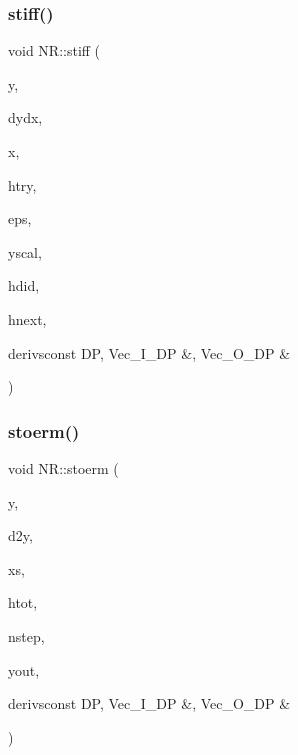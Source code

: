 \subsubsection{\texorpdfstring{stiff()}{stiff()}}
{\footnotesize\ttfamily void N\+R\+::stiff (\begin{DoxyParamCaption}\item[{\mbox{\hyperlink{namespaceNR_ab293e06a6bf799d8a7ed932b6852bcb8}{Vec\+\_\+\+I\+O\+\_\+\+DP}} \&}]{y,  }\item[{\mbox{\hyperlink{namespaceNR_ab293e06a6bf799d8a7ed932b6852bcb8}{Vec\+\_\+\+I\+O\+\_\+\+DP}} \&}]{dydx,  }\item[{\mbox{\hyperlink{namespaceNR_af6ff762dd605ff477b8e52387253a02a}{DP}} \&}]{x,  }\item[{const \mbox{\hyperlink{namespaceNR_af6ff762dd605ff477b8e52387253a02a}{DP}}}]{htry,  }\item[{const \mbox{\hyperlink{namespaceNR_af6ff762dd605ff477b8e52387253a02a}{DP}}}]{eps,  }\item[{\mbox{\hyperlink{namespaceNR_a9f943da53862537c552e2a770cb170ae}{Vec\+\_\+\+I\+\_\+\+DP}} \&}]{yscal,  }\item[{\mbox{\hyperlink{namespaceNR_af6ff762dd605ff477b8e52387253a02a}{DP}} \&}]{hdid,  }\item[{\mbox{\hyperlink{namespaceNR_af6ff762dd605ff477b8e52387253a02a}{DP}} \&}]{hnext,  }\item[{void }]{derivsconst D\+P, Vec\+\_\+\+I\+\_\+\+D\+P \&, Vec\+\_\+\+O\+\_\+\+D\+P \& }\end{DoxyParamCaption})}

\mbox{\label{namespaceNR_a9a4beb20936c6e96b577a4f5e8c9d157}} 
\subsubsection{\texorpdfstring{stoerm()}{stoerm()}}
{\footnotesize\ttfamily void N\+R\+::stoerm (\begin{DoxyParamCaption}\item[{\mbox{\hyperlink{namespaceNR_a9f943da53862537c552e2a770cb170ae}{Vec\+\_\+\+I\+\_\+\+DP}} \&}]{y,  }\item[{\mbox{\hyperlink{namespaceNR_a9f943da53862537c552e2a770cb170ae}{Vec\+\_\+\+I\+\_\+\+DP}} \&}]{d2y,  }\item[{const \mbox{\hyperlink{namespaceNR_af6ff762dd605ff477b8e52387253a02a}{DP}}}]{xs,  }\item[{const \mbox{\hyperlink{namespaceNR_af6ff762dd605ff477b8e52387253a02a}{DP}}}]{htot,  }\item[{const int}]{nstep,  }\item[{\mbox{\hyperlink{namespaceNR_a970094d23441f8ef6a45282a7eb2103d}{Vec\+\_\+\+O\+\_\+\+DP}} \&}]{yout,  }\item[{void }]{derivsconst D\+P, Vec\+\_\+\+I\+\_\+\+D\+P \&, Vec\+\_\+\+O\+\_\+\+D\+P \& }\end{DoxyParamCaption})}


